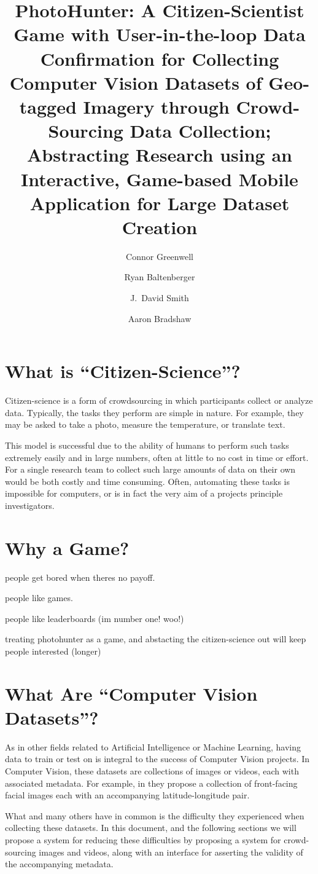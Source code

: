 \documentclass{article}
\title{PhotoHunter: A Citizen-Scientist Game with User-in-the-loop 
  Data Confirmation for Collecting Computer Vision Datasets of
  Geo-tagged Imagery through Crowd-Sourcing Data Collection; Abstracting
  Research using an Interactive, Game-based Mobile Application for Large
  Dataset Creation}
\author{Connor Greenwell \and Ryan Baltenberger 
  \and J.\ David Smith \and Aaron Bradshaw}
\begin{document}
\maketitle

\section{What is ``Citizen-Science''?}

Citizen-science is a form of crowdsourcing in which participants
collect or analyze data. Typically, the tasks they perform are simple
in nature. For example, they may be asked to take a photo, measure the 
temperature, or translate text.

This model is successful due to the ability of humans to perform such
tasks extremely easily and in large numbers, often at little to no
cost in time or effort. For a single research team to collect such
large amounts of data on their own would be both costly and time
consuming. Often, automating these tasks is impossible for computers,
or is in fact the very aim of a projects principle investigators.

\section{Why a Game?}

people get bored when theres no payoff.

people like games. 

people like leaderboards (im number one! woo!)

treating photohunter as a game, and abstacting the citizen-science out
will keep people interested (longer)

\section{What Are ``Computer Vision Datasets''?}

As in other fields related to Artificial Intelligence or Machine
Learning, having data to train or test on is integral to the success
of Computer Vision projects. In Computer Vision, these datasets are 
collections of images or videos, each with
associated metadata. For example, in \cite{islam2014geofaces} they
propose a collection of front-facing facial images each with an
accompanying latitude-longitude pair. 

What \cite{islam2014geofaces} and many others have in common
is the difficulty they experienced when collecting these datasets. In
this document, and the following sections we will propose a system for
reducing these difficulties by proposing a system for crowd-sourcing
images and videos, along with an interface for asserting the validity
of the accompanying metadata.
\end{document}
